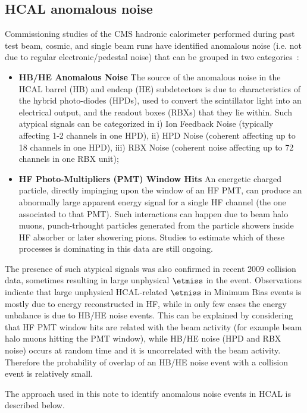 \subsection{HCAL anomalous noise} \label{sec:HCALNoise}
Commissioning studies of the CMS hadronic calorimeter performed 
during past test beam, cosmic, and single beam runs have 
identified anomalous noise (i.e. not due to regular 
electronic/pedestal noise) that can be grouped in two categories~\cite{Chatrchyan:1225105}:
\begin{itemize}
\item{\bf HB/HE Anomalous Noise} The source of the anomalous noise in the HCAL 
barrel (HB) and endcap (HE) subdetectors is due to characteristics 
of the hybrid photo-diodes (HPDs), used to convert the scintillator light into 
an electrical output, and the readout boxes (RBXs) that they lie within.
Such atypical signals can be categorized 
in i) Ion Feedback Noise (typically affecting 1-2 channels in one HPD), ii) HPD Noise 
(coherent affecting up to 18 channels in one HPD), iii) RBX Noise 
(coherent noise affecting up to 72 channels in one RBX unit);
\item{\bf HF Photo-Multipliers (PMT) Window Hits} An energetic charged particle, directly 
impinging upon the window of an HF PMT, can produce an abnormally large apparent 
energy signal for a single HF channel (the one associated to that PMT). 
Such interactions can happen due to beam halo muons, punch-trhought particles generated 
from the particle showers inside HF absorber or later showering pions.
Studies to estimate which of these processes is dominating in this data are still ongoing.
\end{itemize}

The presence of such atypical signals was also confirmed in recent 
2009 collision data, sometimes resulting in large unphysical $\etmiss$ in the event. 
Observations indicate that large unphysical HCAL-related $\etmiss$ 
in Minimum Bias events is mostly due to energy reconstructed in HF, 
while in only few cases the energy unbalance is due to HB/HE noise events. 
This can be explained by considering that HF PMT window hits 
are related with the beam activity (for example beam halo muons hitting the PMT window), 
while HB/HE noise (HPD and RBX noise) occurs at random time and it is 
uncorrelated with the beam activity. Therefore the probability of overlap 
of an HB/HE noise event with a collision event is relatively small.

The approach used in this note to identify anomalous noise events in HCAL is described below.

